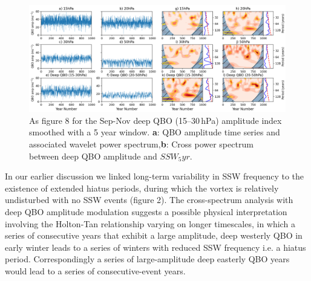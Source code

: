 
\begin{center}
\begin{figure}[h!]
\includegraphics[width = \textwidth]{Figures/Figures-origins/QBO_levels_amp.png}
\caption[Wavelet and cross spectra for the deep QBO amplitude in UKESM.]{As figure 8 for the Sep-Nov deep QBO (15--30\,hPa) amplitude index smoothed with a 5 year window. \textbf{a}: QBO amplitude time series and associated wavelet power spectrum,\textbf{b}: Cross power spectrum between deep QBO amplitude and $SSW_5yr$.}
\label{fig:QBO_SSW_subfig}
\end{figure}
\end{center}



In our earlier discussion we linked long-term variability in SSW frequency to the existence of extended hiatus periods, during which the vortex is relatively undisturbed with no SSW events (figure 2). The cross-spectrum analysis with deep QBO amplitude modulation suggests a possible physical interpretation involving the Holton-Tan relationship varying on longer timescales, in which a series of consecutive years that exhibit a large amplitude, deep westerly QBO in early winter leads to a series of winters with reduced SSW frequency i.e. a hiatus period. Correspondingly a series of large-amplitude deep easterly QBO years would lead to a series of consecutive-event years.

